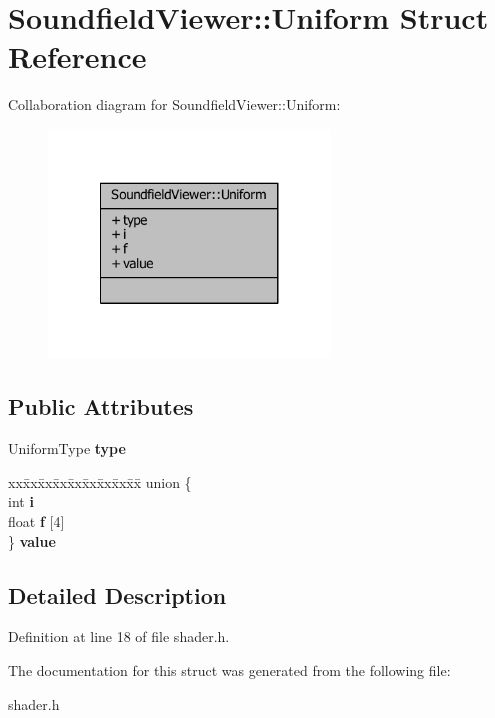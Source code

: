 \section{Soundfield\-Viewer\-:\-:Uniform Struct Reference}
\label{structSoundfieldViewer_1_1Uniform}


Collaboration diagram for Soundfield\-Viewer\-:\-:Uniform\-:\nopagebreak
\begin{figure}[H]
\begin{center}
\leavevmode
\includegraphics[width=212pt]{df/d4c/structSoundfieldViewer_1_1Uniform__coll__graph}
\end{center}
\end{figure}
\subsection*{Public Attributes}
\begin{DoxyCompactItemize}
\item 
Uniform\-Type {\bfseries type}\label{structSoundfieldViewer_1_1Uniform_a8a5ffdec2b623a106e6e4b794c0d9bfc}

\item 
\begin{tabbing}
xx\=xx\=xx\=xx\=xx\=xx\=xx\=xx\=xx\=\kill
union \{\\
\>int {\bfseries i}\\
\>float {\bfseries f} [4]\\
\} {\bfseries value}\label{structSoundfieldViewer_1_1Uniform_a2561cb7fbf56ac88a997c204590ccf28}
\\

\end{tabbing}\end{DoxyCompactItemize}


\subsection{Detailed Description}


Definition at line 18 of file shader.\-h.



The documentation for this struct was generated from the following file\-:\begin{DoxyCompactItemize}
\item 
shader.\-h\end{DoxyCompactItemize}

